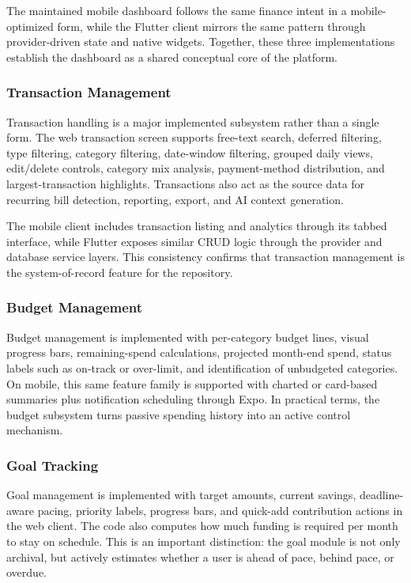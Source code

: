 \documentclass[conference]{IEEEtran}
\begin{document}
The maintained mobile dashboard follows the same finance intent in a mobile-optimized form, while the Flutter client mirrors the same pattern through provider-driven state and native widgets. Together, these three implementations establish the dashboard as a shared conceptual core of the platform.

\subsubsection{Transaction Management}
Transaction handling is a major implemented subsystem rather than a single form. The web transaction screen supports free-text search, deferred filtering, type filtering, category filtering, date-window filtering, grouped daily views, edit/delete controls, category mix analysis, payment-method distribution, and largest-transaction highlights. Transactions also act as the source data for recurring bill detection, reporting, export, and AI context generation.

The mobile client includes transaction listing and analytics through its tabbed interface, while Flutter exposes similar CRUD logic through the provider and database service layers. This consistency confirms that transaction management is the system-of-record feature for the repository.

\subsubsection{Budget Management}
Budget management is implemented with per-category budget lines, visual progress bars, remaining-spend calculations, projected month-end spend, status labels such as on-track or over-limit, and identification of unbudgeted categories. On mobile, this same feature family is supported with charted or card-based summaries plus notification scheduling through Expo. In practical terms, the budget subsystem turns passive spending history into an active control mechanism.

\subsubsection{Goal Tracking}
Goal management is implemented with target amounts, current savings, deadline-aware pacing, priority labels, progress bars, and quick-add contribution actions in the web client. The code also computes how much funding is required per month to stay on schedule. This is an important distinction: the goal module is not only archival, but actively estimates whether a user is ahead of pace, behind pace, or overdue.
\end{document}
